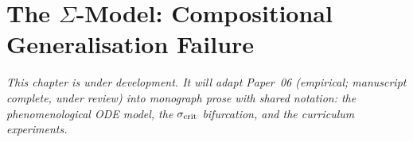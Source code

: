 \chapter{The $\Sigma$-Model: Compositional Generalisation Failure}
\label{ch:sigma-model}

\textit{This chapter is under development. It will adapt Paper~06 (empirical; manuscript
complete, under review) into monograph prose with shared notation: the phenomenological
ODE model, the $\sigma_{\mathrm{crit}}$ bifurcation, and the curriculum experiments.}
